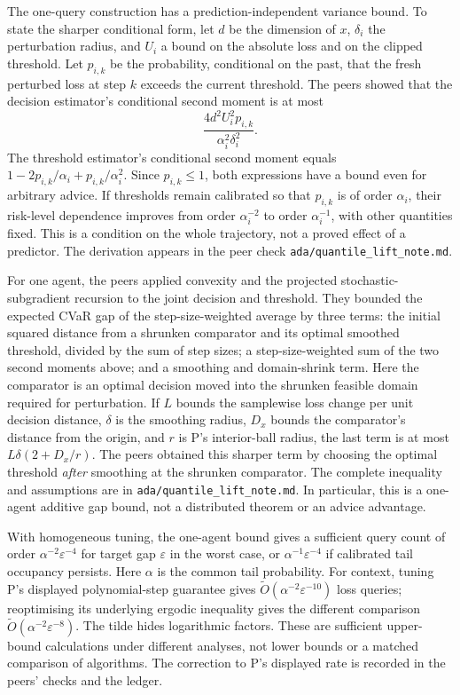 \documentclass{article}
\begin{document}
The one-query construction has a prediction-independent variance bound. To state the sharper conditional
form, let \(d\) be the dimension of \(x\), \(\delta_i\) the perturbation radius, and \(U_i\) a bound on
the absolute loss and on the clipped threshold. Let \(p_{i,k}\) be the probability, conditional on the
past, that the fresh perturbed loss at step \(k\) exceeds the current threshold. The peers showed that
the decision estimator's conditional second moment is at most
\[
\frac{4d^2U_i^2p_{i,k}}{\alpha_i^2\delta_i^2}.
\]
The threshold estimator's conditional second moment equals \(1-2p_{i,k}/\alpha_i+p_{i,k}/\alpha_i^2\).
Since \(p_{i,k}\leq 1\), both expressions have a bound even for arbitrary advice. If thresholds remain
calibrated so that \(p_{i,k}\) is of order \(\alpha_i\), their risk-level dependence improves from order
\(\alpha_i^{-2}\) to order \(\alpha_i^{-1}\), with other quantities fixed. This is a condition on the
whole trajectory, not a proved effect of a predictor. The derivation appears in the peer check
\texttt{ada/quantile\_lift\_note.md}.

For one agent, the peers applied convexity and the projected stochastic-subgradient recursion to the
joint decision and threshold. They bounded the expected CVaR gap of the step-size-weighted average by
three terms: the initial squared distance from a shrunken comparator and its optimal smoothed threshold,
divided by the sum of step sizes; a step-size-weighted sum of the two second moments above; and a
smoothing and domain-shrink term. Here the comparator is an optimal decision moved into the shrunken
feasible domain required for perturbation. If \(L\) bounds the samplewise loss change per unit decision
distance, \(\delta\) is the smoothing radius, \(D_x\) bounds the comparator's distance from the origin,
and \(r\) is P's interior-ball radius, the last term is at most \(L\delta(2+D_x/r)\). The peers obtained
this sharper term by choosing the optimal threshold \emph{after} smoothing at the shrunken comparator.
The complete inequality and assumptions are in \texttt{ada/quantile\_lift\_note.md}. In particular, this
is a one-agent additive gap bound, not a distributed theorem or an advice advantage.

With homogeneous tuning, the one-agent bound gives a sufficient query count of order
\(\alpha^{-2}\varepsilon^{-4}\) for target gap \(\varepsilon\) in the worst case, or
\(\alpha^{-1}\varepsilon^{-4}\) if calibrated tail occupancy persists. Here \(\alpha\) is the common tail
probability. For context, tuning P's displayed polynomial-step guarantee gives \(\widetilde
O(\alpha^{-2}\varepsilon^{-10})\) loss queries; reoptimising its underlying ergodic inequality gives the
different comparison \(\widetilde O(\alpha^{-2}\varepsilon^{-8})\). The tilde hides logarithmic factors.
These are sufficient upper-bound calculations under different analyses, not lower bounds or a matched
comparison of algorithms. The correction to P's displayed rate is recorded in the peers' checks and the
ledger.
\end{document}
